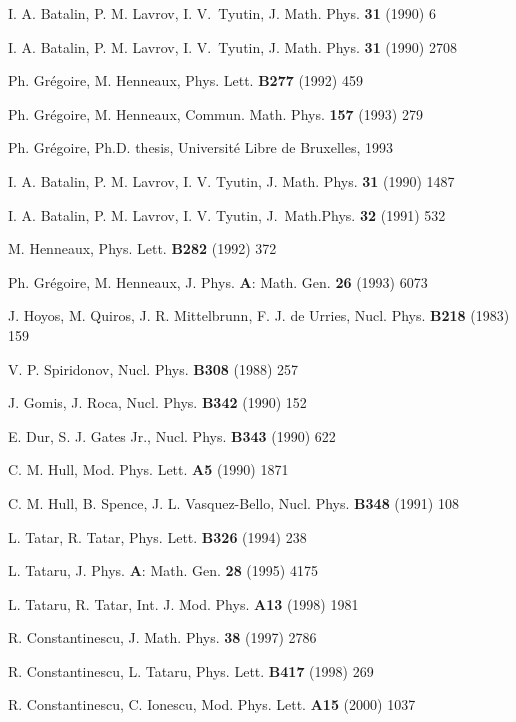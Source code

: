 \documentclass[a4paper,12pt]{article}
\begin{document}
\begin{thebibliography}{99}
  I. A. Batalin, P. M. Lavrov, I. V.\ Tyutin, J. Math. Phys. {%
\textbf{31}} (1990) 6

  I. A. Batalin, P. M. Lavrov, I. V.\ Tyutin, J. Math. Phys. {%
\textbf{31}} (1990) 2708

  Ph. Gr\'{e}goire, M. Henneaux, Phys. Lett. {\textbf{B277}}
(1992) 459

  Ph. Gr\'{e}goire, M. Henneaux, Commun. Math. Phys. {\textbf{157%
}} (1993) 279

  Ph. Gr\'{e}goire, Ph.D. thesis, Universit\'{e} Libre de
Bruxelles, 1993

  I. A. Batalin, P. M. Lavrov, I. V. Tyutin, J. Math. Phys. {%
\textbf{31}} (1990) 1487

  I. A. Batalin, P. M. Lavrov, I. V. Tyutin, J.\ Math.Phys. {%
\textbf{32}} (1991) 532

  M. Henneaux, Phys. Lett. {\textbf{B282}} (1992) 372

  Ph. Gr\'{e}goire, M. Henneaux, J. Phys. {\textbf{A}}: Math.
Gen. \textbf{26} (1993) 6073

  J. Hoyos, M. Quiros, J. R. Mittelbrunn, F. J. de Urries, Nucl.
Phys. {\textbf{B218}} (1983) 159

  V. P. Spiridonov, Nucl. Phys. {\textbf{B308}} (1988) 257

  J. Gomis, J. Roca, Nucl. Phys. {\textbf{B342}} (1990) 152

  E. Dur, S. J. Gates Jr., Nucl. Phys. {\textbf{B343}} (1990) 622

  C. M. Hull, Mod. Phys. Lett. {\textbf{A5}} (1990) 1871

  C. M. Hull, B. Spence, J. L. Vasquez-Bello, Nucl. Phys. {%
\textbf{B348}} (1991) 108

  L. Tatar, R. Tatar, Phys. Lett. {\textbf{B326}} (1994) 238

  L. Tataru, J. Phys. \textbf{A}: Math. Gen. {\textbf{28}}
(1995) 4175

  L. Tataru, R. Tatar, Int. J. Mod. Phys. {\textbf{A13}} (1998)
1981

  R. Constantinescu, J. Math. Phys. {\textbf{38}} (1997) 2786

  R. Constantinescu, L. Tataru, Phys. Lett. {\textbf{B417}}
(1998) 269

  R. Constantinescu, C. Ionescu, Mod. Phys. Lett. {\textbf{A15}}
(2000) 1037
\end{thebibliography}
\end{document}
